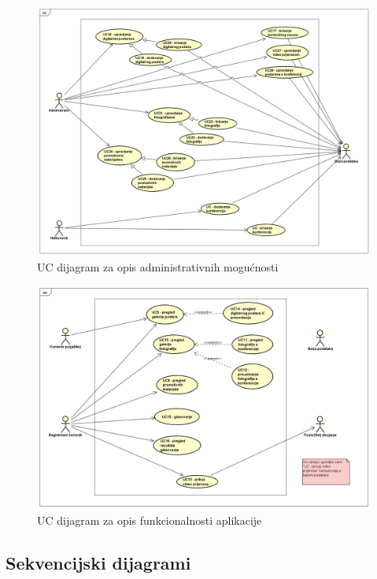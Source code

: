 					\begin{figure}
						\includegraphics[width=\linewidth]{Slike/UCDiagramAdmin.png}
						\caption{UC dijagram za opis administrativnih mogućnosti}
					\end{figure}
				
					\begin{figure}
						\includegraphics[width=\linewidth]{Slike/UCDiagramAppFunctionalities.png}
						\caption{UC dijagram za opis funkcionalnosti aplikacije}
					\end{figure}
				
				\eject		
			
			\clearpage
			\subsection{Sekvencijski dijagrami}
				
